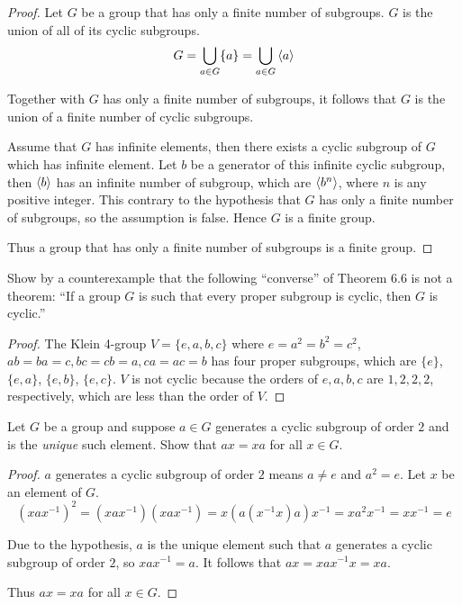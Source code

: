 \begin{proof}
    Let $G$ be a group that has only a finite number of subgroups. $G$ is the union of all of its cyclic subgroups.
    \[
        G = \bigcup_{a\in G} \{ a \} = \bigcup_{a\in G}\left\langle{a}\right\rangle
    \]

    Together with $G$ has only a finite number of subgroups, it follows that $G$ is the union of a finite number of cyclic subgroups.

    Assume that $G$ has infinite elements, then there exists a cyclic subgroup of $G$ which has infinite element. Let $b$ be a generator of this infinite cyclic subgroup, then $\left\langle{b}\right\rangle$ has an infinite number of subgroup, which are $\left\langle{b^{n}}\right\rangle$, where $n$ is any positive integer. This contrary to the hypothesis that $G$ has only a finite number of subgroups, so the assumption is false. Hence $G$ is a finite group.

    Thus a group that has only a finite number of subgroups is a finite group.
\end{proof}

\newpage
\begin{exercise}
    Show by a counterexample that the following ``converse'' of Theorem 6.6 is not a theorem: ``If a group $G$ is such that every proper subgroup is cyclic, then $G$ is cyclic.\@''
\end{exercise}

\begin{proof}
    The Klein 4-group $V = \{ e, a, b, c \}$ where $e = a^{2} = b^{2} = c^{2}$, $ab = ba = c, bc = cb = a, ca = ac = b$ has four proper subgroups, which are $\{ e \}$, $\{ e, a \}$, $\{ e, b \}$, $\{ e, c \}$. $V$ is not cyclic because the orders of $e, a, b, c$ are $1, 2, 2, 2$, respectively, which are less than the order of $V$.
\end{proof}

\newpage
\begin{exercise}
    Let $G$ be a group and suppose $a\in G$ generates a cyclic subgroup of order $2$ and is the \textit{unique} such element. Show that $ax = xa$ for all $x\in G$.
\end{exercise}

\begin{proof}
    $a$ generates a cyclic subgroup of order $2$ means $a\ne e$ and $a^{2} = e$. Let $x$ be an element of $G$.
    \[
        {(xax^{-1})}^{2} = (xax^{-1})(xax^{-1}) = x(a(x^{-1}x)a)x^{-1} = xa^{2}x^{-1} = xx^{-1} = e
    \]

    Due to the hypothesis, $a$ is the unique element such that $a$ generates a cyclic subgroup of order $2$, so $xax^{-1} = a$. It follows that $ax = xax^{-1}x = xa$.

    Thus $ax = xa$ for all $x\in G$.
\end{proof}

